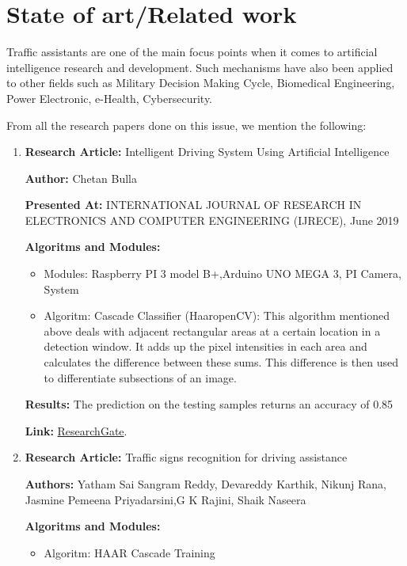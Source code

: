 \documentclass[runningheads,a4paper,11pt]{report}
\begin{document}
\chapter{State of art/Related work}
\label{chapter:stateOfArt}

Traffic assistants are one of the main focus points when it comes to artificial intelligence research and development. Such mechanisms have also been applied to other fields such as Military Decision Making Cycle, Biomedical Engineering, Power Electronic, e-Health, Cybersecurity. 

From all the research papers done on this issue, we mention the following:

\begin{enumerate}
  \item \textbf{Research Article: }Intelligent Driving System Using Artificial Intelligence 
  
  \textbf{Author: } Chetan Bulla
  
  \textbf{Presented At: } INTERNATIONAL JOURNAL OF RESEARCH IN ELECTRONICS AND COMPUTER ENGINEERING (IJRECE), June 2019
  
  \textbf{Algoritms and Modules: }
  \begin{itemize}
     \item Modules: Raspberry PI 3 model B+,Arduino UNO MEGA 3, PI Camera, System
     \item Algoritm: Cascade Classifier (HaaropenCV): This algorithm mentioned above deals with adjacent rectangular areas at a certain location in a detection window. It adds up the pixel intensities in each area and calculates the difference between these sums. This difference is then used to differentiate subsections of an image.  
   \end{itemize}
   
   \textbf{Results: } The prediction on the testing samples returns an accuracy of
0.85

    \textbf{Link: } \href{https://www.researchgate.net/publication/286509832_A_Review_of_Intelligent_Driving_Style_Analysis_Systems_and_Related_Artificial_Intelligence_Algorithms}{ResearchGate}.
    
    \item \textbf{Research Article: }Traffic signs recognition for driving assistance
  
  \textbf{Authors: } Yatham Sai Sangram Reddy, Devareddy Karthik, Nikunj Rana, Jasmine Pemeena Priyadarsini,G K Rajini, Shaik Naseera
  
  \textbf{Algoritms and Modules: }
  \begin{itemize}
     \item Algoritm: HAAR Cascade Training
   \end{itemize}
   

\end{enumerate}
\end{document}
